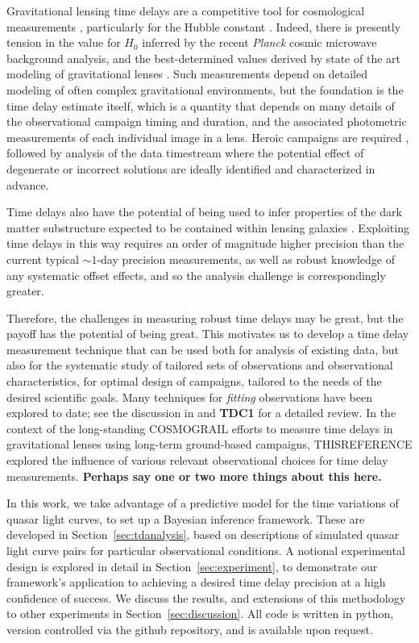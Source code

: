 \documentclass{emulateapj}
\begin{document}
Gravitational lensing time delays are a competitive tool for
cosmological measurements \citep{Coe2009b}, particularly for the
Hubble constant \citep[$H_0$;][]{Refsdal1964a}.  Indeed, there is
presently tension in the value for $H_0$ inferred by the recent
\emph{Planck} cosmic microwave background analysis, and the
best-determined values derived by state of the art modeling of
gravitational lenses \citep[e.g.][]{Suyu2013a,Suyu2013b}.  Such
measurements depend on detailed modeling of often complex
gravitational environments, but the foundation is the time delay
estimate itself, which is a quantity that depends on many details of
the observational campaign timing and duration, and the associated
photometric measurements of each individual image in a lens. Heroic
campaigns are required \citep[e.g.][]{Tewes2013a}, followed by
analysis of the data timestream where the potential effect of
degenerate or incorrect solutions are ideally identified and
characterized in advance.

Time delays also have the potential of being used to infer properties
of the dark matter substructure expected to be contained within
lensing galaxies \citep{Keeton2009a}.  Exploiting time delays in this
way requires an order of magnitude higher precision than the current
typical $\sim1$-day precision measurements, as well as robust
knowledge of any systematic offset effects, and so the analysis
challenge is correspondingly greater.  

Therefore, the challenges in measuring robust time delays may be
great, but the payoff has the potential of being great. This motivates
us to develop a time delay measurement technique that can be used both
for analysis of existing data, but also for the systematic study of
tailored sets of observations and observational characteristics, for
optimal design of campaigns, tailored to the needs of the desired
scientific goals. Many techniques for \emph{fitting} observations have
been explored to date; see the discussion in \citet{Dobler2013a} and
{\bf TDC1} for a detailed review.  In the context of the long-standing
COSMOGRAIL efforts to measure time delays in gravitational lenses
using long-term ground-based campaigns, THISREFERENCE explored the
influence of various relevant observational choices for time delay
measurements. {\bf Perhaps say one or two more things about this
  here.}

In this work, we take advantage of a predictive model for the time
variations of quasar light curves, to set up a Bayesian inference
framework.  These are developed in Section~\ref{sec:tdanalysis}, based
on descriptions of simulated quasar light curve pairs for particular
observational conditions.  A notional experimental design is explored
in detail in Section~\ref{sec:experiment}, to demonstrate our
framework's application to achieving a desired time delay precision at
a high confidence of success.  We discuss the results, and extensions
of this methodology to other experiments in
Section~\ref{sec:discussion}.  All code is written in python, version
controlled via the github repository, and is available upon request.
\end{document}
